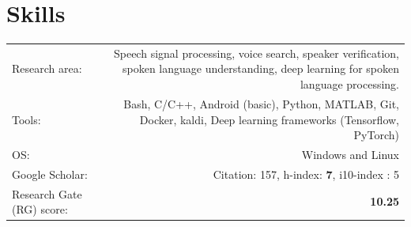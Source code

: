 \documentclass[10pt]{article}
\begin{document}
\section*{Skills}
\begin{tabular}{L!{\VRule}R}
	Research area: &Speech signal processing, voice search, speaker verification, spoken language understanding, deep learning for spoken language processing.\vspace{0.2cm}\\
	Tools:& Bash, C/C++, Android (basic), Python, MATLAB,  Git, Docker, kaldi, Deep learning frameworks (Tensorflow, PyTorch) \vspace{0.2cm}\\
	OS: & Windows and Linux \vspace{0.2cm}\\
	Google Scholar: & {Citation}: 157, {h-index}: \textbf{7}, {i10-index} : 5 \vspace{0.2cm}\\
	Research Gate (RG) score: & \textbf{10.25}
\end{tabular}
\end{document}
